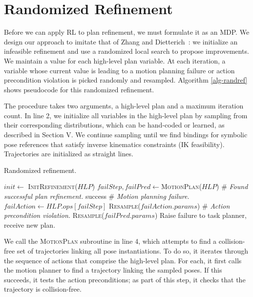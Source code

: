 \section{Randomized Refinement}
Before we can apply RL to plan refinement, we must formulate it as an MDP.
We design our approach to imitate that of Zhang and Dietterich~\cite{JobShopSched}:
we initialize an infeasible refinement and use a randomized local search to propose
improvements. We maintain a value for each high-level plan
variable. At each iteration, a variable whose current value is leading to a motion planning failure or
action precondition violation is picked randomly and resampled.
Algorithm \ref{alg-randref} shows pseudocode for this randomized refinement.

The procedure takes two arguments, a high-level plan and a maximum
iteration count. In line 2, we initialize all variables in the high-level plan by sampling
from their corresponding distributions, which can be hand-coded or learned, as described in Section V. We continue sampling
until we find bindings for symbolic pose references that satisfy
inverse kinematics constraints (IK feasibility). Trajectories are
initialized as straight lines.

\begin{algorithm}[t]
 \caption{Randomized refinement.} \label{alg-randref}
 \begin{algorithmic}[1]
  \State $init \leftarrow$ \textsc{InitRefinement}($HLP$)
  \State $failStep, failPred \leftarrow $\textsc{MotionPlan}($HLP$)
  \State \# \emph{Found successful plan refinement.}
  \State \Return success
  \EndIf
  \State \# \emph{Motion planning failure.}
  \State $failAction \leftarrow HLP.ops[failStep]$
  \State \textsc{Resample}($failAction.params$)
  \Else
  \State \# \emph{Action precondition violation.}
  \State \textsc{Resample}($failPred.params$)
  \EndIf
  \EndFor
  \State Raise failure to task planner, receive new plan.
  \EndProcedure
 \end{algorithmic}
\end{algorithm}

We call the \textsc{MotionPlan} subroutine in line 4, which attempts to
find a collision-free set of trajectories linking all pose instantiations.
To do so, it iterates through the sequence of actions that comprise the high-level plan.
For each, it first calls the motion planner to find a trajectory
linking the sampled poses. If this succeeds, it tests the action preconditions;
as part of this step, it checks that the trajectory is collision-free.

